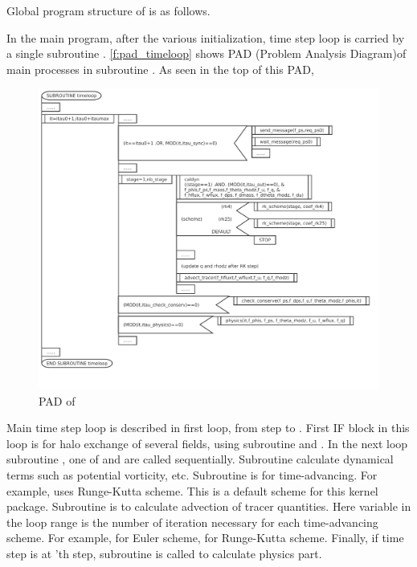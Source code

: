 Global program structure of \DYNAMICO is as follows.

In the main program, after the various initialization, time step loop is
carried by a single subroutine .
%
\autoref{f:pad_timeloop} shows PAD (Problem Analysis
Diagram)\footnotemark of main processes in subroutine .
%
As seen in the top of this PAD,


\begin{figure}[htb]
 \centering
 \includegraphics[scale=.4]{figs/timeloop.pdf}
 \caption{PAD of }\label{f:pad_timeloop}
\end{figure}

Main time step loop is described in first  loop, from step
 to .
%
First IF block in this loop is for halo exchange of several fields,
using subroutine  and .
%
In the next  loop subroutine , one of
 and  are called sequentially.
%
Subroutine  calculate dynamical terms such as potential
vorticity, etc.
%
Subroutine  is for time-advancing. For example,
 uses Runge-Kutta scheme.
%
This is a default scheme for this kernel package.
%
Subroutine  is to calculate advection of tracer
quantities.
%
Here variable  in the loop range is the number of
iteration necessary for each time-advancing scheme. For example,
 for Euler scheme,  for Runge-Kutta scheme.
%
Finally, if time step  is at 'th step,
subroutine  is called to calculate physics part.



